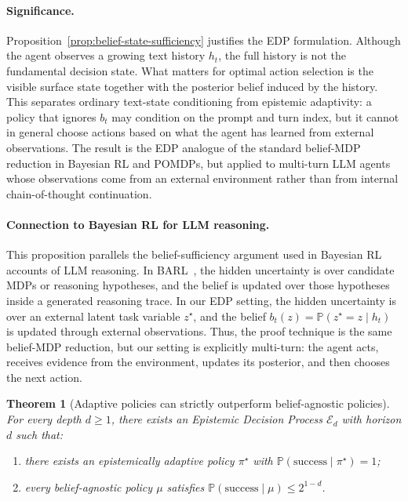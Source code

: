 \documentclass[11pt]{article}
\theoremstyle{plain}
\newtheorem{theorem}{Theorem}[section]
\theoremstyle{definition}
\theoremstyle{remark}
\begin{document}
\paragraph{Significance.}
Proposition~\ref{prop:belief-state-sufficiency} justifies the EDP formulation. Although the agent observes a growing text history \(h_t\), the full history is not the fundamental decision state. What matters for optimal action selection is the visible surface state together with the posterior belief induced by the history. This separates ordinary text-state conditioning from epistemic adaptivity: a policy that ignores \(b_t\) may condition on the prompt and turn index, but it cannot in general choose actions based on what the agent has learned from external observations. The result is the EDP analogue of the standard belief-MDP reduction in Bayesian RL and POMDPs, but applied to multi-turn LLM agents whose observations come from an external environment rather than from internal chain-of-thought continuation.

\paragraph{Connection to Bayesian RL for LLM reasoning.}
This proposition parallels the belief-sufficiency argument used in Bayesian RL accounts of LLM reasoning. In BARL~\citep{zhang2025markovianreflectiveexplorationbayesadaptive}, the hidden uncertainty is over candidate MDPs or reasoning hypotheses, and the belief is updated over those hypotheses inside a generated reasoning trace. In our EDP setting, the hidden uncertainty is over an external latent task variable \(z^\star\), and the belief \(b_t(z)=\mathbb{P}(z^\star=z\mid h_t)\) is updated through external observations. Thus, the proof technique is the same belief-MDP reduction, but our setting is explicitly multi-turn: the agent acts, receives evidence from the environment, updates its posterior, and then chooses the next action.



\begin{theorem}[Adaptive policies can strictly outperform belief-agnostic policies]
\label{thm:adaptive-gap}
For every depth $d \geq 1$, there exists an Epistemic Decision Process $\mathcal{E}_d$ 
with horizon $d$ such that:
\begin{enumerate}
    \item there exists an epistemically adaptive policy $\pi^\star$ with 
          $\mathbb{P}(\mathrm{success} \mid \pi^\star) = 1$;
    \item every belief-agnostic policy $\mu$ satisfies 
          $\mathbb{P}(\mathrm{success} \mid \mu) \leq 2^{1-d}$.
\end{enumerate}
\end{theorem}
\end{document}
